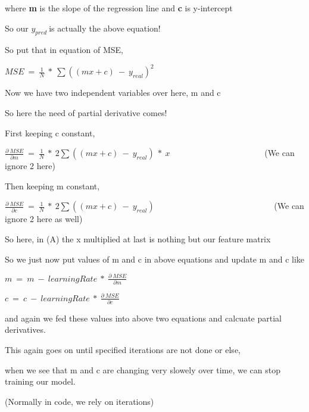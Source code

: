 where \textbf{m} is the slope of the regression line and \textbf{c} is y-intercept





So our $\displaystyle y_{pred} \ $is actually the above equation!



So put that in equation of MSE,





$\displaystyle MSE\ =\ \frac{1}{N} \ *\ \sum (( mx+c) \ -\ y_{real})^{2}$



Now we have two independent variables over here, m and c

So here the need of partial derivative comes!





First keeping c constant,





$\displaystyle \frac{\partial \ MSE}{\partial m} \ =\ \frac{1}{N} \ *\ 2\sum (( mx+c) \ -\ y_{real}) \ *\ x$ \ \ \ \ \ \ \ \ \ \ \ \ \ \ \ \ \ \ \ \ \ \ (We can ignore 2 here)







Then keeping m constant,



$\displaystyle \frac{\partial \ MSE}{\partial c} \ =\ \frac{1}{N} \ *\ 2\sum (( mx+c) \ -\ y_{real})$ \ \ \ \ \ \ \ \ \ \ \ \ \ \ \ \ \ \ \ \ \ \ \ \ \ \ \ \ (We can ignore 2 here as well)







So here, in (A) the x multiplied at last is nothing but our feature matrix

So we just now put values of m and c in above equations and update m and c like





$\displaystyle m\ =\ m\ -\ learningRate\ *\ \frac{\partial \ MSE}{\partial m}$





$\displaystyle c\ =\ c\ -\ learningRate\ *\ \frac{\partial \ MSE}{\partial c}$





and again we fed these values into above two equations and calcuate partial derivatives.

This again goes on until specified iterations are not done or else,

when we see that m and c are changing very slowely over time, we can stop training our model.

(Normally in code, we rely on iterations)
